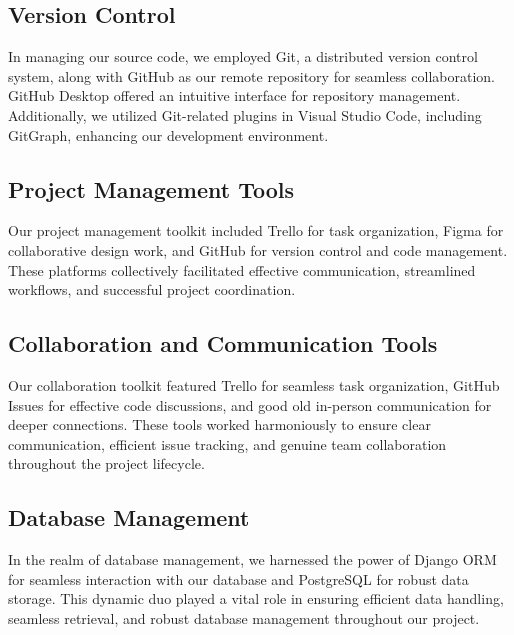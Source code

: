 \documentclass[12pt,a4paper]{article}
\begin{document}
\begin{spacing}{1.5}
    \subsection{Version Control}
    In managing our source code, we employed Git, a distributed version control
    system, along with GitHub as our remote repository for seamless collaboration.
    GitHub Desktop offered an intuitive interface for repository management.
    Additionally, we utilized Git-related plugins in Visual Studio Code, including
    GitGraph, enhancing our development environment.

    \subsection{Project Management Tools}
    Our project management toolkit included Trello for task organization, Figma for
    collaborative design work, and GitHub for version control and code management.
    These platforms collectively facilitated effective communication, streamlined
    workflows, and successful project coordination.

    \subsection{Collaboration and Communication Tools}
    Our collaboration toolkit featured Trello for seamless task organization,
    GitHub Issues for effective code discussions, and good old in-person
    communication for deeper connections. These tools worked harmoniously to ensure
    clear communication, efficient issue tracking, and genuine team collaboration
    throughout the project lifecycle.

    \subsection{Database Management}
    In the realm of database management, we harnessed the power of Django ORM for
    seamless interaction with our database and PostgreSQL for robust data storage.
    This dynamic duo played a vital role in ensuring efficient data handling,
    seamless retrieval, and robust database management throughout our project.


\end{spacing}
\end{document}
